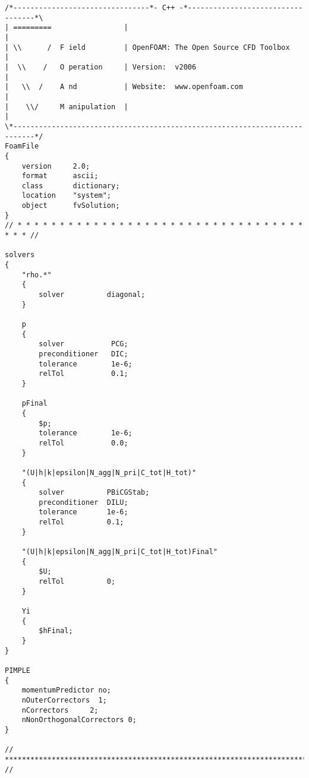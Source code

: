 \begin{lstlisting}[style=cpp,title=\texttt{system/fvSolutions},captionpos=t]
/*--------------------------------*- C++ -*----------------------------------*\
| =========                 |                                                 |
| \\      /  F ield         | OpenFOAM: The Open Source CFD Toolbox           |
|  \\    /   O peration     | Version:  v2006                                 |
|   \\  /    A nd           | Website:  www.openfoam.com                      |
|    \\/     M anipulation  |                                                 |
\*---------------------------------------------------------------------------*/
FoamFile
{
    version     2.0;
    format      ascii;
    class       dictionary;
    location    "system";
    object      fvSolution;
}
// * * * * * * * * * * * * * * * * * * * * * * * * * * * * * * * * * * * * * //

solvers
{
    "rho.*"
    {
        solver          diagonal;
    }

    p
    {
        solver           PCG;
        preconditioner   DIC;
        tolerance        1e-6;
        relTol           0.1;
    }

    pFinal
    {
        $p;
        tolerance        1e-6;
        relTol           0.0;
    }

    "(U|h|k|epsilon|N_agg|N_pri|C_tot|H_tot)"
    {
        solver          PBiCGStab;
        preconditioner  DILU;
        tolerance       1e-6;
        relTol          0.1;
    }

    "(U|h|k|epsilon|N_agg|N_pri|C_tot|H_tot)Final"
    {
        $U;
        relTol          0;
    }

    Yi
    {
        $hFinal;
    }
}

PIMPLE
{
    momentumPredictor no;
    nOuterCorrectors  1;
    nCorrectors     2;
    nNonOrthogonalCorrectors 0;
}

// ************************************************************************* //
\end{lstlisting}